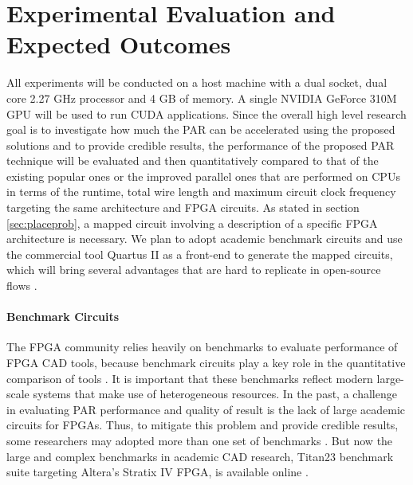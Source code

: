 \documentclass[a4paper,oneside,12pt]{article}
\begin{document}




\section{Experimental Evaluation and Expected Outcomes}

All experiments will be conducted on a host machine with a dual socket, dual core 2.27 GHz processor and 4 GB of memory. A single NVIDIA GeForce 310M GPU will be used to run CUDA applications.
Since the overall high level research goal is to investigate how much the PAR can be accelerated using the proposed solutions and to provide credible results, the performance of the proposed PAR technique will be evaluated and then quantitatively compared to that of the existing popular ones or the improved parallel ones that are performed on CPUs in terms of the runtime, total wire length and maximum circuit clock frequency targeting the same architecture and FPGA circuits. As stated in section \ref{sec:placeprob}, a mapped circuit involving a description of a specific FPGA architecture is necessary. We plan to adopt academic benchmark circuits and use the commercial tool Quartus II as a front-end to generate the mapped circuits, which will bring several advantages that are hard to replicate in open-source flows \cite{murray2015timing}.

\paragraph{Benchmark Circuits}
The FPGA community relies heavily on benchmarks to evaluate performance of FPGA CAD tools, because benchmark circuits play a key role in the quantitative comparison of tools \cite{murray2015timing}. It is important that these benchmarks reflect modern large-scale systems that make use of heterogeneous resources.
In the past, a challenge in evaluating PAR performance and quality of result is the lack of large academic circuits for FPGAs. Thus, to mitigate this problem and provide credible results, some researchers may adopted more than one set of benchmarks \cite{bian2010towards}. But now the large and complex benchmarks in academic CAD research, Titan23 benchmark suite targeting Altera's Stratix IV FPGA, is available online \cite{Titan23}.
\end{document}

